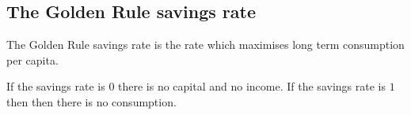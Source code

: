 
\subsection{The Golden Rule savings rate}

The Golden Rule savings rate is the rate which maximises long term consumption per capita.

If the savings rate is \(0\) there is no capital and no income. If the savings rate is \(1\) then then there is no consumption.

